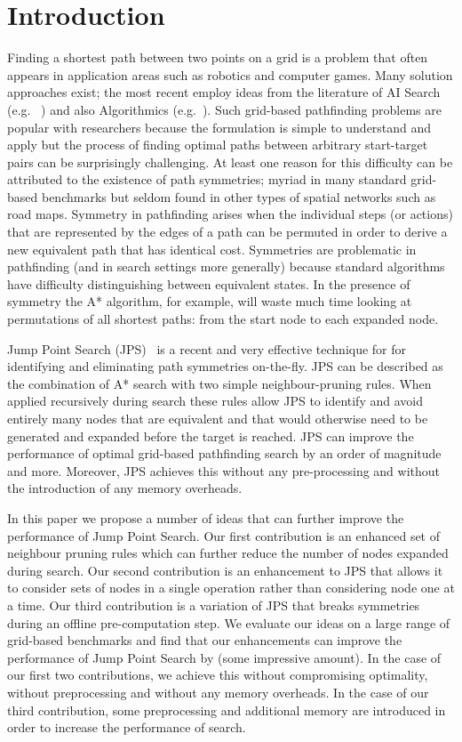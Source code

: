 \section{Introduction}
\label{sec::introduction}
Finding a shortest path between two points on a grid is a problem that often 
appears in application areas such as robotics and computer games. 
Many solution approaches exist; the most recent employ ideas from the
literature of AI Search (e.g. ~\cite{pochter10,goldenberg10,yap11,urasKH13})
and also Algorithmics (e.g.~\cite{storandt13,antsfeld12}). Such grid-based
pathfinding problems are popular with researchers because the formulation is
simple to understand and apply but the process of finding optimal paths
between arbitrary start-target pairs can be surprisingly challenging. At least
one reason for this difficulty can be attributed to the existence of path
symmetries; myriad in many standard grid-based benchmarks but seldom
found in other types of spatial networks such as road maps.  Symmetry in
pathfinding arises when the individual steps (or actions) that are represented
by the edges of a path can be permuted in order to derive a new equivalent
path that has identical cost.  Symmetries are problematic in pathfinding (and
in search settings more generally) because standard algorithms have difficulty
distinguishing between equivalent states.  In the presence of symmetry the A*
algorithm, for example, will waste much time looking at permutations of all
shortest paths: from the start node to each expanded node.

Jump Point Search (JPS)~\cite{harabor11b} is a recent and very effective 
technique for for identifying and eliminating path symmetries on-the-fly. 
JPS can be described as the combination of A* search with two simple 
neighbour-pruning rules. When applied recursively during search these
rules allow JPS to identify and avoid entirely many nodes that are 
equivalent and that would otherwise need to be generated
and expanded before the target is reached.
JPS can improve the performance of optimal grid-based pathfinding search 
by an order of magnitude and more. Moreover, JPS achieves this without 
any pre-processing and without the introduction of any memory overheads.

In this paper we propose a number of ideas that can further improve the
performance of Jump Point Search. Our first contribution is an enhanced
set of neighbour pruning rules which can further reduce the number of 
nodes expanded during search. Our second contribution is an enhancement
to JPS that allows it to consider sets of nodes in a single operation 
rather than considering node one at a time.
Our third contribution is a variation of JPS that breaks symmetries
during an offline pre-computation step.
We evaluate our ideas on a large range of grid-based benchmarks and
find that our enhancements can improve the performance of Jump Point Search
by (some impressive amount). In the case of our first
two contributions, we achieve this without compromising optimality, without
preprocessing and without any memory overheads. In the case of our third
contribution, some preprocessing and additional memory are introduced 
in order to increase the performance of search.

